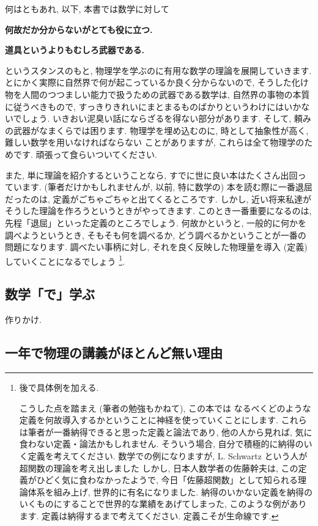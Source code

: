\documentclass[openany, a4paper, oneside]{jsbook}
\begin{document}
何はともあれ, 以下, 本書では数学に対して
\begin{center}
\textbf{何故だか分からないがとても役に立つ.}

\textbf{道具というよりもむしろ武器である.}
\end{center}
というスタンスのもと, 物理学を学ぶのに有用な数学の理論を展開していきます.
とにかく実際に自然界で何が起こっているか良く分からないので,
そうした化け物を人間のつつましい能力で扱うための武器である数学は,
自然界の事物の本質に従うべきもので,
すっきりきれいにまとまるものばかりというわけにはいかないでしょう.
いきおい泥臭い話にならざるを得ない部分があります.
そして, 頼みの武器がなまくらでは困ります.
物理学を埋め込むのに, 時として抽象性が高く, 難しい数学を用いなければならない
ことがありますが, これらは全て物理学のためです.
頑張って食らいついてください.

また, 単に理論を紹介するということなら, すでに世に良い本はたくさん出回っています.
(筆者だけかもしれませんが, 以前, 特に数学の) 本を読む際に一番退屈だったのは,
定義がごちゃごちゃと出てくるところです.
しかし, 近い将来私達がそうした理論を作ろうというときがやってきます.
このとき一番重要になるのは, 先程「退屈」といった定義のところでしょう.
何故かというと, 一般的に何かを調べようというとき,
そもそも何を調べるか, どう調べるかということが一番の問題になります.
調べたい事柄に対し, それを良く反映した物理量を導入 (定義) していくことになるでしょう \footnote{後で具体例を加える.

こうした点を踏まえ (筆者の勉強もかねて), この本では
なるべくどのような定義を何故導入するかということに神経を使っていくことにします.
これらは筆者が一番納得できると思った定義と論法であり, 他の人から見れば,
気に食わない定義・論法かもしれません.
そういう場合, 自分で積極的に納得のいく定義を考えてください.
数学での例になりますが, L. Schwartz という人が超関数の理論を考え出しました \footnotemark
しかし, 日本人数学者の佐藤幹夫は, この定義がひどく気に食わなかったようで,
今日「佐藤超関数」として知られる理論体系を組み上げ, 世界的に有名になりました.
納得のいかない定義を納得のいくものにすることで世界的な業績をあげてしまった, このような例があります.
定義は納得するまで考えてください.
定義こそが生命線です.}.
\subsection{数学「で」学ぶ}

作りかけ.
\subsection{一年で物理の講義がほとんど無い理由}
\end{document}

